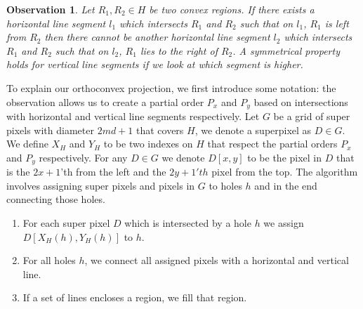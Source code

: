 \documentclass[a4paper,UKenglish,cleveref]{lipics-v2019}
\newtheorem{observation}{Observation}
\begin{document}
\begin{observation}
Let $R_1,R_2 \in H$ be two convex regions. If there exists a horizontal line segment $l_1$ which intersects $R_1$ and $R_2$ such that on $l_1$, $R_1$ is left from $R_2$ then there cannot be another horizontal line segment $l_2$ which intersects $R_1$ and $R_2$ such that on $l_2$, $R_1$ lies to the right of $R_2$. A symmetrical property holds for vertical line segments if we look at which segment is higher.
\end{observation}

To explain our orthoconvex projection, we first introduce some notation: the observation allows us to create a partial order $P_x$ and $P_y$ based on intersections with horizontal and vertical line segments respectively. Let $G$ be a grid of super pixels with diameter $2md+1$ that covers $H$, we denote a superpixel as $D \in G$. We define $X_H$ and $Y_H$ to be two indexes on $H$ that respect the partial orders $P_x$ and $P_y$ respectively. For any $D \in G$ we denote $D[x,y]$ to be the pixel in $D$ that is the $2x+1$'th from the left and the $2y+1'th$ pixel from the top. The algorithm involves assigning super pixels and pixels in $G$ to holes $h$ and in the end connecting those holes.

\begin{enumerate}
\item For each super pixel $D$ which is intersected by a hole $h$ we assign $D[X_H(h), Y_H(h)]$ to $h$.
\item For all holes $h$, we connect all assigned pixels with a horizontal and vertical line.
\item If a set of lines encloses a region, we fill that region.
\end{enumerate}
\end{document}
